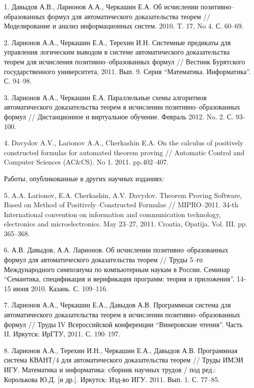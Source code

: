 \documentclass[a4paper]{report}
\begin{document}
1. Давыдов А.В., Ларионов А.А., Черкашин Е.А. Об исчислении
позитивно--образованных формул для автоматического доказательства
теорем // Моделирование и анализ информационных систем. 2010. T. 17, No
4. С. 60--69.

2. Ларионов А.А., Черкашин Е.А., Терехин И.Н. Системные предикаты для
управления логическим выводом в системе автоматического доказательства
теорем для исчисления позитивно--образованных формул // Вестник
Бурятского государственного университета, 2011. Вып. 9. Серия
``Математика. Информатика''. С. 94--98.

3. Ларионов А.А., Черкашин Е.А. Параллельные схемы алгоритмов
автоматического доказательства теорем в исчислении
позитивно--образованных формул // Дистанционное и виртуальное
обучение. Февраль 2012. No. 2. С. 93-100.

4. Davydov A.V., Larionov A.A., Cherkashin E.A. On the calculus of
positively constructed formulas for automated theorem proving //
Automatic Control and Computer Sciences (AC\&CS). No 1. 2011. pp.402--407.

Работы, опубликованные в других научных изданиях:

5. A.A. Larionov, E.A. Cherkashin, A.V. Davydov. Theorem Proving
Software, Based on Method of Positively--Constructed Formulae // MIPRO--2011. 34-th International convention on information and communication
technology, electronics and microelectronics. May 23--27,
2011. Croatia, Opatija. Vol. III. pp. 365--368.

6. А.В. Давыдов, А.А. Ларионов. Об исчислении позитивно--образованных
формул для автоматического доказательства теорем // Труды 5--го
Международного симпозиума по компьютерным наукам в России. Семинар
``Семантика, спецификация и верификация программ: теория и приложения''. 14-15 июня 2010. Казань. С. 109--116.

7. Ларионов А.А., Черкашин Е.А., Давыдов А.В. Программная система для
автоматического доказательства теорем в исчислении
позитивно--образованных формул // Труды IV
Всероссийской конференции ``Винеровские чтения''. Часть II. Иркутск: ИрГТУ, 2011. С. 190--197.

8. Ларионов А.А., Терехин И.Н., Черкашин Е.А., Давыдов А.В.
Программная система КВАНТ/4 для автоматического доказательства теорем
// Труды ИМЭИ ИГУ. Математика и информатика: сборник научных трудов / под ред.: Королькова Ю.Д. [и др.]. Иркутск: Изд-во ИГУ. 2011. Вып. 1. С. 77--85.

\end{document}
